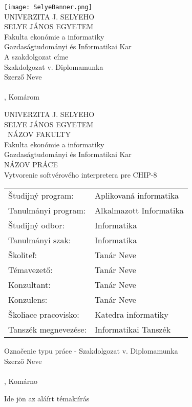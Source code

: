\documentclass[a4paper,oneside,onecolumn,12pt]{LegrandOrangeBook}
\begin{document}
\thispagestyle{empty}
\begin{minipage}[c][\textheight][c]{\textwidth}
	{\centering
	\texttt{[image: SelyeBanner.png]}\\
	\vskip0.5cm
	{\LARGE UNIVERZITA J. SELYEHO}\\
	\vskip0.5cm
	{\LARGE SELYE JÁNOS EGYETEM}\\
    \vskip0.5cm
	{\large Fakulta ekonómie a informatiky}\\
	\vskip0.5cm
	{\large Gazdaságtudományi és Informatikai Kar}\\
	\vfill
	{\Huge A szakdolgozat címe}\\
	Szakdolgozat v. Diplomamunka\\
	Szerző Neve \\
    \ISBN\\
	\hfill\the\year{}, Komárom\hfill
	}
\end{minipage}

\cleardoublepage
\begingroup
\makeatletter
\let\ps@plain\ps@empty
\begin{minipage}[c][\textheight][c]{\textwidth}
	{\centering
	{\large UNIVERZITA J. SELYEHO\\SELYE JÁNOS EGYETEM}\\
	\vskip0.5cm
	{\ NÁZOV FAKULTY\\Fakulta ekonómie a informatiky\\Gazdaságtudományi és Informatikai Kar}\\
	\vfill
	{\Large NÁZOV PRÁCE\\Vytvorenie softvérového interpretera pre CHIP-8 }\\
	\vfill
	\thispagestyle{empty}
	\begin{tabular}{ll}
		Študijný program:    & Aplikovaná informatika \\
		Tanulmányi program:  & Alkalmazott Informatika\\
		Študijný odbor:      & Informatika\\
		Tanulmányi szak:     & Informatika\\
		Školiteľ:            & Tanár Neve\\
		Témavezető:          & Tanár Neve\\
		Konzultant:          & Tanár Neve \\
		Konzulens:           & Tanár Neve\\
		Školiace pracovisko: & Katedra informatiky\\
		Tanszék megnevezése: & Informatikai Tanszék\\
	\end{tabular}
	\vfill
	Označenie typu práce - Szakdolgozat v. Diplomamunka\\
	Szerző Neve\\
    \ISBN \\
	\hfill\the\year{}, Komárno\hfill
	}
\end{minipage}
\endgroup
{
\hspace*{-2cm}
Ide jön az aláírt témakiírás
}
\tableofcontents %
\pagebreak
\listoffigures  %
\end{document}
